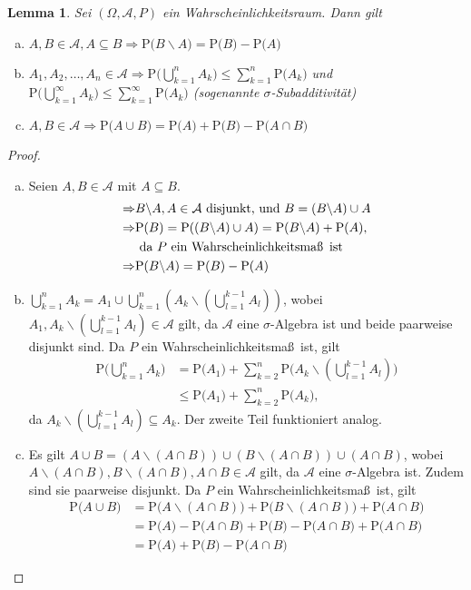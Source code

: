 \documentclass[a4paper,12pt,fleqn]{scrartcl}
\newcommand{\m}[1]{\mathcal{ #1 }}
\newcommand{\p}[1]{\text{P(} #1 \text{)}}
\newcommand{\WR}{Wahrscheinlichkeitsraum}
\newcommand{\WM}{Wahrscheinlichkeitsmaß}
\newcommand{\impl}{\Rightarrow}
\theoremstyle{definition}
\theoremstyle{plain}
\newtheorem{lemma}[definition]{Lemma}
\theoremstyle{remark}
\begin{document}
\begin{lemma}
Sei $(\Omega, \m{A}, P)$ ein \WR. Dann gilt
\begin{enumerate}[a)]
\item $A, B \in \m{A}, A \subseteq B \impl \p{B \backslash A} = \p{B} - \p{A}$
\item $A_1, A_2, \ldots , A_n \in \m{A} \impl \p{\bigcup_{k=1}^n A_k} \leq \sum_{k=1}^n \p{A_k}$ und $\p{\bigcup_{k=1}^\infty A_k} \leq \sum_{k=1}^\infty \p{A_k}$ (sogenannte $\sigma$-Subadditivität)
\item $A, B \in \m{A} \impl \p{A \cup B} = \p{A} + \p{B} - \p{A \cap B}$
\end{enumerate}
\end{lemma}
\begin{proof}
\begin{enumerate}[a)]
\item Seien $A, B \in \m{A}$ mit $A \subseteq B$.
\begin{align*}
\impl &B \backslash A, A \in \m{A} \text{ disjunkt, und } B = (B \backslash A) \cup A \\
\impl &\p{B} = \p{(B \backslash A) \cup A} = \p{B \backslash A} + \p{A}, \\
&\text{ da } P \text{ ein \WM \, ist} \\
\impl &\p{B \backslash A} = \p{B} - \p{A}
\end{align*}
\item $\bigcup_{k=1}^n A_k = A_1 \cup \bigcup_{k=1}^n (A_k \backslash (\bigcup_{l=1}^{k-1} A_l))$, wobei $A_1, A_k \backslash (\bigcup_{l=1}^{k-1} A_l) \in \m{A}$ gilt, da $\m{A}$ eine $\sigma$-Algebra ist und beide paarweise disjunkt sind. Da $P$ ein \WM \, ist, gilt
\begin{align*}
\p{\bigcup_{k=1}^n A_k} &= \p{A_1} + \sum_{k=2}^n \p{A_k \backslash (\bigcup_{l=1}^{k-1} A_l)} \\
&\leq \p{A_1} + \sum_{k=2}^n \p{A_k},
\end{align*}
da $A_k \backslash (\bigcup_{l=1}^{k-1} A_l) \subseteq A_k.$ Der zweite Teil funktioniert analog.
\item Es gilt $A \cup B = (A \backslash (A \cap B)) \cup (B \backslash (A \cap B)) \cup (A \cap B)$, wobei $A \backslash (A \cap B), B \backslash (A \cap B), A \cap B \in \m{A}$ gilt, da $\m{A}$ eine $\sigma$-Algebra ist. Zudem sind sie paarweise disjunkt. Da $P$ ein \WM \, ist, gilt
\begin{align*}
\p{A \cup B} &= \p{A \backslash (A \cap B)} + \p{B \backslash (A \cap B)} + \p{A \cap B} \\
&= \p{A} - \p{A \cap B} + \p{B} - \p{A \cap B} + \p{A \cap B} \\
&= \p{A} + \p{B} - \p{A \cap B}
\end{align*}
\end{enumerate}
\end{proof}
\end{document}

